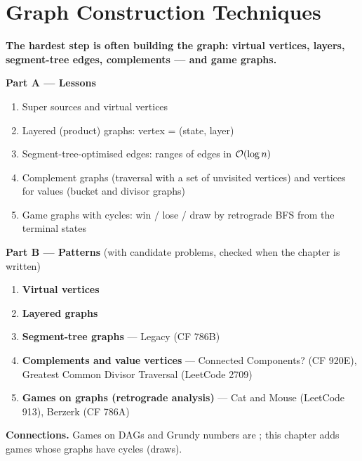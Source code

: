 \chapter{Graph Construction Techniques}
\label{ch:construction}

\begin{tcolorbox}[enhanced, colback=white, colframe=secondaryblue, boxrule=1pt, arc=2mm]
\textbf{\large\textcolor{primaryblue}{The hardest step is often building the graph: virtual vertices, layers, segment-tree edges, complements --- and game graphs.}}
\end{tcolorbox}


\begin{plannedbox}
\textbf{Part A --- Lessons}
\begin{enumerate}[leftmargin=*, label=\textbf{A\arabic*.}, itemsep=1pt]
    \item Super sources and virtual vertices
    \item Layered (product) graphs: vertex = (state, layer)
    \item Segment-tree-optimised edges: ranges of edges in $\mathcal{O}(\log n)$
    \item Complement graphs (traversal with a set of unvisited vertices) and vertices for values (bucket and divisor graphs)
    \item Game graphs with cycles: win / lose / draw by retrograde BFS from the terminal states
\end{enumerate}
\textbf{Part B --- Patterns} (with candidate problems, checked when the chapter is written)
\begin{enumerate}[leftmargin=*, label=\textbf{P\arabic*.}, itemsep=1pt]
    \item \textbf{Virtual vertices}
    \item \textbf{Layered graphs}
    \item \textbf{Segment-tree graphs} --- Legacy {\small\color{darkgray}(CF 786B)}
    \item \textbf{Complements and value vertices} --- Connected Components? {\small\color{darkgray}(CF 920E)}, Greatest Common Divisor Traversal {\small\color{darkgray}(LeetCode 2709)}
    \item \textbf{Games on graphs (retrograde analysis)} --- Cat and Mouse {\small\color{darkgray}(LeetCode 913)}, Berzerk {\small\color{darkgray}(CF 786A)}
\end{enumerate}
\textbf{Connections.} Games on DAGs and Grundy numbers are ; this chapter adds games whose graphs have cycles (draws).
\end{plannedbox}

